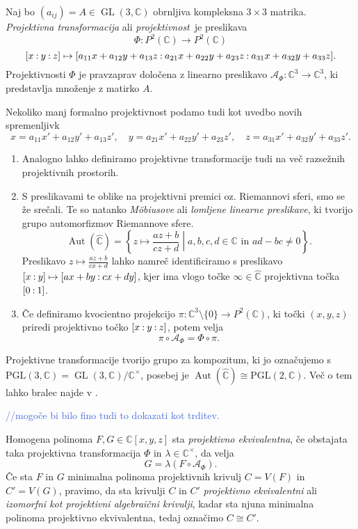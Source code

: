 \documentclass[mat1]{fmfdelo}
\newcommand{\C}{\mathbb C}
\newcommand{\CM}{\mathbb C ^\times}
\newcommand{\PC}{P^2(\mathbb C)}
\newcommand{\RS}{\widehat{\C}}
\newcommand{\Cxyz}{\C[x,y,z]}
\newcommand{\pcoor}[1]{%
  \begingroup\lccode`~=`: \lowercase{\endgroup
  \edef~}{\mathbin{\mathchar\the\mathcode`:}\nobreak}%
  [%
  \begingroup
  \mathcode`:=\string"8000
  #1%
  \endgroup
  ]%
}
\newcommand{\kom}[1]{
    \textcolor{RoyalBlue}{//#1}
}
\DeclareMathOperator{\GL}{GL}
\DeclareMathOperator{\Aut}{Aut}
\theoremstyle{definition}
\begin{document}
\begin{definicija}
    Naj bo $(a_{ij}) = A \in \GL(3, \C)$ obrnljiva kompleksna $3 \times 3$ matrika. \emph{Projektivna transformacija} ali \emph{projektivnost} je preslikava
        $$\Phi : \PC \to \PC$$
        $$\pcoor{x:y:z} \mapsto \pcoor{a_{11}x + a_{12}y + a_{13}z: a_{21}x + a_{22}y + a_{23}z: a_{31}x + a_{32}y + a_{33}z}.$$
    Projektivnosti $\Phi$ je pravzaprav določena z linearno preslikavo $\mathcal{A}_{\Phi} : \C^3 \to \C^3$, ki predstavlja množenje z matirko $A$.

    Nekoliko manj formalno projektivnost podamo tudi kot uvedbo novih spremenljivk 
    \[
        x = a_{11}x' + a_{12}y' + a_{13}z', \quad y = a_{21}x' + a_{22}y' + a_{23}z', \quad z = a_{31}x' + a_{32}y' + a_{33}z'.  
    \]
\end{definicija}

\begin{opomba}
    \begin{enumerate}
        \item Analogno lahko definiramo projektivne transformacije tudi na več razsežnih projektivnih prostorih. 
        \item
        S preslikavami te oblike na projektivni premici oz. Riemannovi sferi, smo se že srečali. Te so natanko \emph{Möbiusove} ali \emph{lomljene linearne preslikave}, ki tvorijo grupo automorfizmov Riemannove sfere.
        $$\Aut(\RS) = \left\{ z \mapsto \frac{az + b}{cz +d} \middle\vert a,b,c,d \in \C \text{ in }  ad - bc \neq 0 \right\}.$$
        Preslikavo $z \mapsto \tfrac{az + b}{cx +d}$ lahko namreč identificiramo s preslikavo $\pcoor{x:y} \mapsto \pcoor{ax + by: cx + dy}$, kjer ima vlogo točke $\infty \in \RS$ projektivna točka $\pcoor{0:1}$. 
        \item
        Če definiramo kvocientno projekcijo $\pi : \C^3 \setminus \{0\} \to \PC$, ki točki $(x,y,z)$ priredi projektivno točko $\pcoor{x:y:z}$, potem velja 
        $$\pi \circ \mathcal{A}_\Phi = \Phi \circ \pi.$$
    \end{enumerate}
\end{opomba}

Projektivne transformacije tvorijo grupo za kompozitum, ki jo označujemo s $\operatorname{PGL(3, \C)} = \GL(3,\C)/\CM$, posebej je $\Aut(\RS) \cong \operatorname{PGL(2,\C)}$. Več o tem lahko bralec najde v \cite[poglavje 11]{Gibson}.
\kom{mogoče bi bilo fino tudi to dokazati kot trditev.}

\begin{definicija}
    Homogena polinoma $F,G \in \Cxyz$ sta \emph{projektivno ekvivalentna}, če obstajata taka projektivna transformacija $\Phi$ in $\lambda \in \CM$, da velja
    $$ G = \lambda (F \circ \mathcal{A}_\Phi). $$
    Če sta $F$ in $G$ minimalna polinoma projektivnih krivulj $C = V(F)$ in $C' = V(G)$, pravimo, da sta krivulji $C$ in $C'$ \emph{projektivno ekvivalentni} ali \emph{izomorfni kot projektivni algebraični krivulji}, kadar sta njuna minimalna polinoma projektivno ekvivalentna, tedaj označimo $C \cong C'$. 
\end{definicija}
\end{document}
